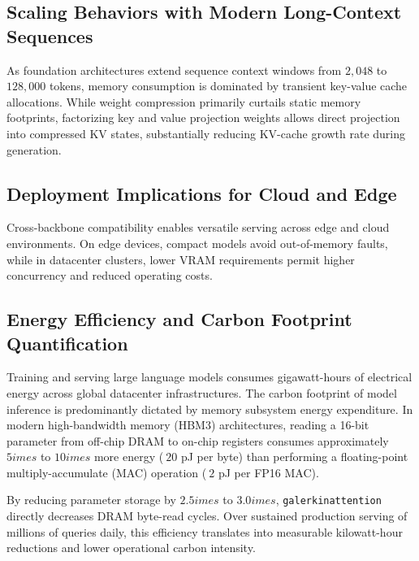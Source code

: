 \subsection{Scaling Behaviors with Modern Long-Context Sequences}
As foundation architectures extend sequence context windows from $2{,}048$ to $128{,}000$ tokens, memory consumption is dominated by transient key-value cache allocations. While weight compression primarily curtails static memory footprints, factorizing key and value projection weights allows direct projection into compressed KV states, substantially reducing KV-cache growth rate during generation.

\subsection{Deployment Implications for Cloud and Edge}
Cross-backbone compatibility enables versatile serving across edge and cloud environments. On edge devices, compact models avoid out-of-memory faults, while in datacenter clusters, lower VRAM requirements permit higher concurrency and reduced operating costs.

\subsection{Energy Efficiency and Carbon Footprint Quantification}
Training and serving large language models consumes gigawatt-hours of electrical energy across global datacenter infrastructures. The carbon footprint of model inference is predominantly dictated by memory subsystem energy expenditure. In modern high-bandwidth memory (HBM3) architectures, reading a 16-bit parameter from off-chip DRAM to on-chip registers consumes approximately $5	imes$ to $10	imes$ more energy ($~20$ pJ per byte) than performing a floating-point multiply-accumulate (MAC) operation ($~2$ pJ per FP16 MAC).

By reducing parameter storage by $2.5	imes$ to $3.0	imes$, \texttt{galerkinattention} directly decreases DRAM byte-read cycles. Over sustained production serving of millions of queries daily, this efficiency translates into measurable kilowatt-hour reductions and lower operational carbon intensity.
